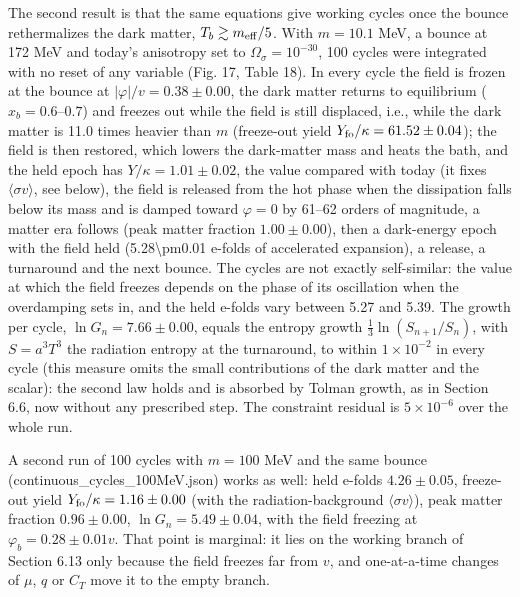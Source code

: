 \documentclass[11pt,a4paper]{article}
\begin{document}
The second result is that the same equations give working cycles once the bounce rethermalizes the dark matter, $T_b\gtrsim m_{\rm eff}/5$. With $m=10.1$ MeV, a bounce at 172 MeV and today's anisotropy set to $\Omega_\sigma=10^{-30}$, 100 cycles were integrated with no reset of any variable (Fig. 17, Table 18). In every cycle the field is frozen at the bounce at $|\varphi|/v=0.38\pm0.00$, the dark matter returns to equilibrium ($x_b=0.6$--$0.7$) and freezes out while the field is still displaced, i.e., while the dark matter is 11.0 times heavier than $m$ (freeze-out yield $Y_{\rm fo}/\kappa=61.52\pm0.04$); the field is then restored, which lowers the dark-matter mass and heats the bath, and the held epoch has $Y/\kappa=1.01\pm0.02$, the value compared with today (it fixes $\langle\sigma v\rangle$, see below), the field is released from the hot phase when the dissipation falls below its mass and is damped toward $\varphi=0$ by 61--62 orders of magnitude, a matter era follows (peak matter fraction $1.00\pm0.00$), then a dark-energy epoch with the field held (5.28\textbackslash{}pm0.01 e-folds of accelerated expansion), a release, a turnaround and the next bounce. The cycles are not exactly self-similar: the value at which the field freezes depends on the phase of its oscillation when the overdamping sets in, and the held e-folds vary between 5.27 and 5.39. The growth per cycle, $\ln G_n=7.66\pm0.00$, equals the entropy growth $\frac{1}{3}\ln(S_{n+1}/S_n)$, with $S=a^3T^3$ the radiation entropy at the turnaround, to within $1\times10^{-2}$ in every cycle (this measure omits the small contributions of the dark matter and the scalar): the second law holds and is absorbed by Tolman growth, as in Section 6.6, now without any prescribed step. The constraint residual is $5\times10^{-6}$ over the whole run.

A second run of 100 cycles with $m=100$ MeV and the same bounce (continuous\_cycles\_100MeV.json) works as well: held e-folds $4.26\pm0.05$, freeze-out yield $Y_{\rm fo}/\kappa=1.16\pm0.00$ (with the radiation-background $\langle\sigma v\rangle$), peak matter fraction $0.96\pm0.00$, $\ln G_n=5.49\pm0.04$, with the field freezing at $\varphi_b=0.28\pm0.01v$. That point is marginal: it lies on the working branch of Section 6.13 only because the field freezes far from $v$, and one-at-a-time changes of $\mu$, $q$ or $C_T$ move it to the empty branch.
\end{document}
